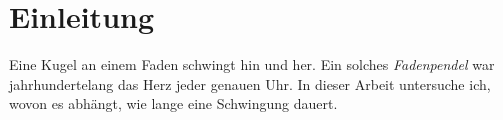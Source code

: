 \documentclass[12pt,a4paper]{article}
\begin{document}
\section{Einleitung}

Eine Kugel an einem Faden schwingt hin und her. Ein solches \emph{Fadenpendel}
war jahrhundertelang das Herz jeder genauen Uhr. In dieser Arbeit untersuche
ich, wovon es abhängt, wie lange eine Schwingung dauert.
\end{document}
